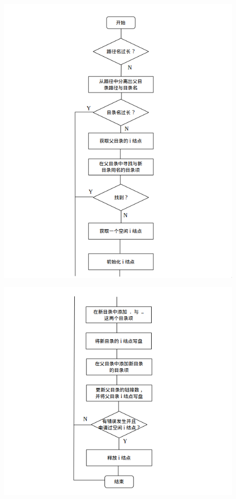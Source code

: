 \documentclass[nofonts]{ctexart}
\begin{document}
\begin{itemize}
  \includegraphics[width=12cm]{./images/./mkdir_1.png}

  \includegraphics[width=12cm]{./images/./mkdir_2.png}
  \end{itemize}
\end{document}
